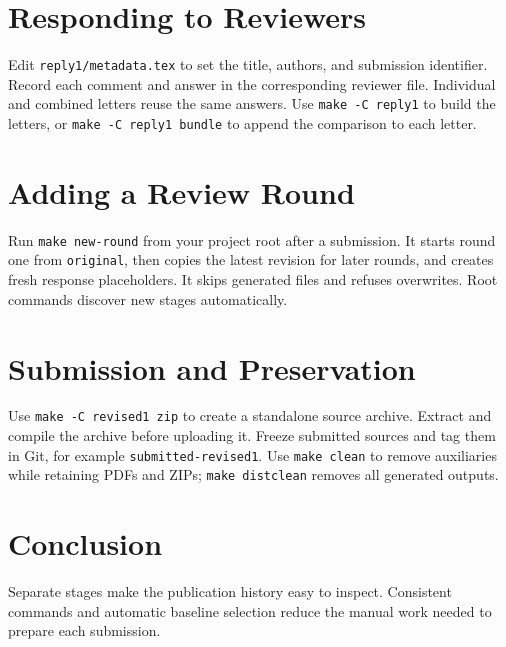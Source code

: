 \documentclass[journal]{IEEEtran}
\begin{document}
\section{Responding to Reviewers}
Edit \texttt{reply1/metadata.tex} to set the title, authors, and submission identifier.
Record each comment and answer in the corresponding reviewer file.
Individual and combined letters reuse the same answers.
Use \texttt{make -C reply1} to build the letters, or \texttt{make -C reply1 bundle}
to append the comparison to each letter.
\section{Adding a Review Round}
Run \texttt{make new-round} from your project root after a submission.
It starts round one from \texttt{original}, then copies the latest revision for later rounds,
and creates fresh response placeholders. It skips generated files and refuses overwrites.
Root commands discover new stages automatically.
\section{Submission and Preservation}
Use \texttt{make -C revised1 zip} to create a standalone source archive.
Extract and compile the archive before uploading it.
Freeze submitted sources and tag them in Git, for example \texttt{submitted-revised1}.
Use \texttt{make clean} to remove auxiliaries while retaining PDFs and ZIPs;
\texttt{make distclean} removes all generated outputs.
\section{Conclusion}
Separate stages make the publication history easy to inspect.
Consistent commands and automatic baseline selection reduce the manual work needed to prepare each submission.


\end{document}
